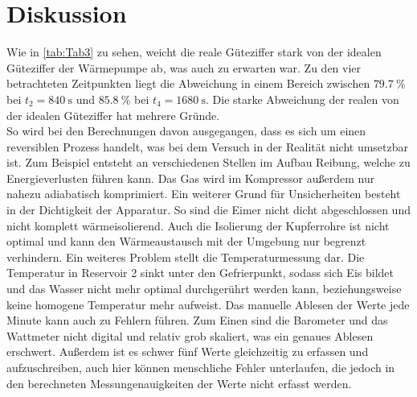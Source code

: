 \section{Diskussion}
\label{sec:Diskussion}

Wie in \autoref{tab:Tab3} zu sehen, weicht die reale Güteziffer stark von der idealen Güteziffer der Wärmepumpe ab, was auch zu erwarten war.
Zu den vier betrachteten Zeitpunkten liegt die Abweichung in einem Bereich zwischen $\qty{79.7}{\percent}$ bei $t_2=\qty{840}{\second}$
und $\qty{85.8}{\percent}$ bei $t_4=\qty{1680}{\second}$.
Die starke Abweichung der realen von der idealen Güteziffer hat mehrere Gründe.\\
So wird bei den Berechnungen davon ausgegangen, dass es sich um einen reversiblen Prozess handelt, was bei dem Versuch in der Realität nicht umsetzbar ist.
Zum Beispiel entsteht an verschiedenen Stellen im Aufbau Reibung, welche zu Energieverlusten führen kann.
Das Gas wird im Kompressor außerdem nur nahezu adiabatisch komprimiert.
Ein weiterer Grund für Unsicherheiten besteht in der Dichtigkeit der Apparatur. So sind die Eimer nicht dicht abgeschlossen und nicht komplett wärmeisolierend.
Auch die Isolierung der Kupferrohre ist nicht optimal und kann den Wärmeaustausch mit der Umgebung nur begrenzt verhindern.
Ein weiteres Problem stellt die Temperaturmessung dar. Die Temperatur in Reservoir 2 sinkt unter den Gefrierpunkt, sodass sich Eis bildet und das Wasser
nicht mehr optimal durchgerührt werden kann, beziehungsweise keine homogene Temperatur mehr aufweist.
Das manuelle Ablesen der Werte jede Minute kann auch zu Fehlern führen. Zum Einen sind die Barometer und das Wattmeter nicht digital und relativ grob skaliert, was ein
genaues Ablesen erschwert. Außerdem ist es schwer fünf Werte gleichzeitig zu erfassen und aufzuschreiben, auch hier können menschliche Fehler unterlaufen,
die jedoch in den berechneten Messungenauigkeiten der Werte nicht erfasst werden.

